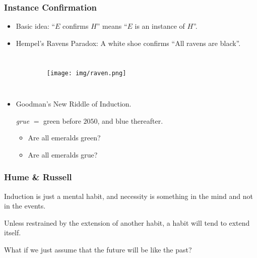 \documentclass[UTF8,11pt,colorlinks,compress,openany]{beamer}%
\begin{document}
\begin{frame}\frametitle{Instance Confirmation}
\begin{itemize}
\item Basic idea: ``$E$ confirms $H$'' means ``$E$ is an instance of $H$''.
\item Hempel's Ravens Paradox: A white shoe confirms ``All ravens are black''.
\begin{columns}
	\begin{prooftree}
		\noLine
		\alwaysSingleLine
	\end{prooftree}
	\begin{figure}
		\texttt{[image: img/raven.png]}
	\end{figure}
\end{columns}
\item Goodman's New Riddle of Induction.\\
\centerline{\emph{grue} $=$ green before $2050$, and blue thereafter.}
\begin{itemize}
	\item Are all emeralds green?
	\item Are all emeralds grue?
\end{itemize}
\end{itemize}
\end{frame}

\begin{frame}\frametitle{Hume \& Russell}
	\begin{proposition}[Hume]
		Induction is just a mental habit, and necessity is something in the mind and not in the events.
	\end{proposition}
	\begin{proposition}[Peirce]
		Unless restrained by the extension of another habit, a habit will tend to extend itself.
	\end{proposition}
What if we just assume that the future will be like the past?
		\begin{figure}[H]
		\end{figure}
\end{frame}
\end{document}
